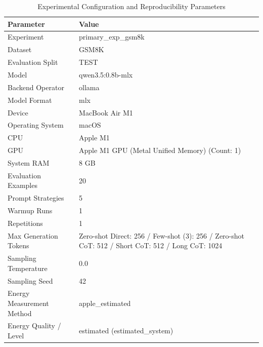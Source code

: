 \begin{table}
\caption{Experimental Configuration and Reproducibility Parameters}
\label{tab:experimental_configuration}
\begin{tabular}{ll}
\toprule
Parameter & Value \\
\midrule
Experiment & primary\_exp\_gsm8k \\
Dataset & GSM8K \\
Evaluation Split & TEST \\
Model & qwen3.5:0.8b-mlx \\
Backend Operator & ollama \\
Model Format & mlx \\
Device & MacBook Air M1 \\
Operating System & macOS \\
CPU & Apple M1 \\
GPU & Apple M1 GPU (Metal Unified Memory) (Count: 1) \\
System RAM & 8 GB \\
Evaluation Examples & 20 \\
Prompt Strategies & 5 \\
Warmup Runs & 1 \\
Repetitions & 1 \\
Max Generation Tokens & Zero-shot Direct: 256 / Few-shot (3): 256 / Zero-shot CoT: 512 / Short CoT: 512 / Long CoT: 1024 \\
Sampling Temperature & 0.0 \\
Sampling Seed & 42 \\
Energy Measurement Method & apple\_estimated \\
Energy Quality / Level & estimated (estimated\_system) \\
\bottomrule
\end{tabular}
\end{table}
